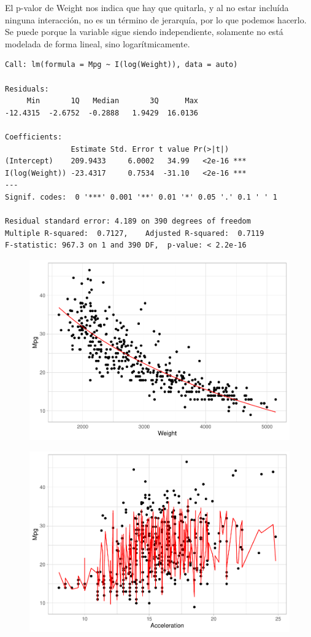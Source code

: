 El p-valor de Weight nos indica que hay que quitarla, y al no estar incluída ninguna interacción, no es un término de jerarquía, por lo que podemos hacerlo. Se puede porque la variable sigue siendo independiente, solamente no está modelada de forma lineal, sino logarítmicamente.

\begin{verbatim}
Call: lm(formula = Mpg ~ I(log(Weight)), data = auto)

Residuals:
     Min       1Q   Median       3Q      Max 
-12.4315  -2.6752  -0.2888   1.9429  16.0136 

Coefficients:
               Estimate Std. Error t value Pr(>|t|)    
(Intercept)    209.9433     6.0002   34.99   <2e-16 ***
I(log(Weight)) -23.4317     0.7534  -31.10   <2e-16 ***
---
Signif. codes:  0 '***' 0.001 '**' 0.01 '*' 0.05 '.' 0.1 ' ' 1

Residual standard error: 4.189 on 390 degrees of freedom
Multiple R-squared:  0.7127,    Adjusted R-squared:  0.7119 
F-statistic: 967.3 on 1 and 390 DF,  p-value: < 2.2e-16
\end{verbatim}

\begin{figure}[H]\includegraphics[width=.9\linewidth]{img/Regresion_files/figure-latex/unnamed-chunk-24-1} \caption{}\end{figure}

\begin{figure}[H]\includegraphics[width=.88\linewidth]{img/Regresion_files/figure-latex/unnamed-chunk-24-2} \caption{}\end{figure}

